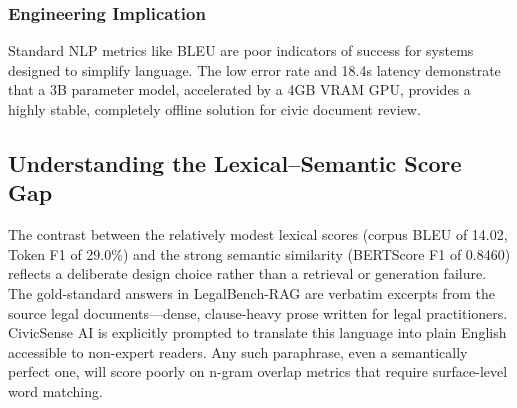 \documentclass[conference]{IEEEtran}
\begin{document}
\subsubsection*{Engineering Implication}
Standard NLP metrics like BLEU are poor indicators of success for systems designed to simplify language. The low error rate and 18.4s latency demonstrate that a 3B parameter model, accelerated by a 4GB VRAM GPU, provides a highly stable, completely offline solution for civic document review.

\begin{table}[!t]
\centering
\caption{Generation Quality and Latency (500 Queries, qwen2.5-3b-instruct, unrestricted-reasoning, local CPU). Corpus-level BLEU and chrF are computed over the full valid response set. Token F1 is the macro-average over individual query pairs.}
\label{tab:generation_results}
\renewcommand{\arraystretch}{1.2}
\end{table}

\subsection{Understanding the Lexical--Semantic Score Gap}
\label{sec:score_gap}

The contrast between the relatively modest lexical scores (corpus BLEU of 14.02, Token F1 of 29.0\%) and the strong semantic similarity (BERTScore F1 of 0.8460) reflects a deliberate design choice rather than a retrieval or generation failure. The gold-standard answers in LegalBench-RAG are verbatim excerpts from the source legal documents---dense, clause-heavy prose written for legal practitioners. CivicSense AI is explicitly prompted to translate this language into plain English accessible to non-expert readers. Any such paraphrase, even a semantically perfect one, will score poorly on n-gram overlap metrics that require surface-level word matching.
\end{document}
